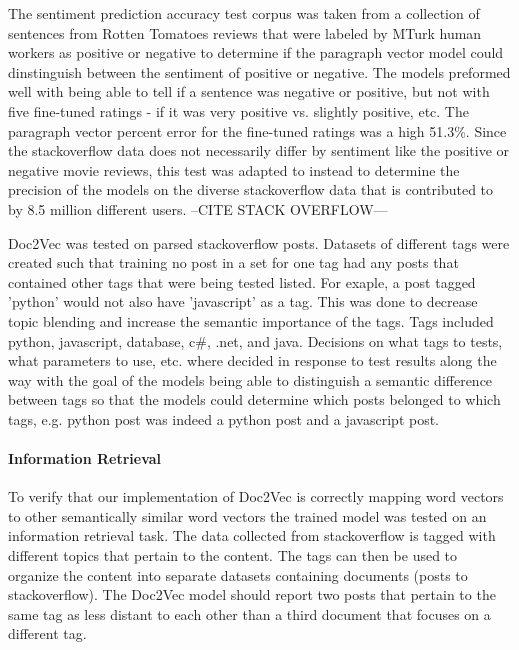 The sentiment prediction accuracy test corpus was taken from a collection of sentences from Rotten Tomatoes reviews that were labeled by MTurk human workers as positive or negative to determine if the paragraph vector model could dinstinguish between the sentiment of positive or negative. The models preformed well with being able to tell if a sentence was negative or positive, but not with five fine-tuned ratings - if it was very positive vs. slightly positive, etc. The paragraph vector percent error for the fine-tuned ratings was a high 51.3\%. Since the stackoverflow data does not necessarily differ by sentiment like the positive or negative movie reviews, this test was adapted to instead to determine the precision of the models on the diverse stackoverflow data that is contributed to by 8.5 million different users. --CITE STACK OVERFLOW---

Doc2Vec was tested on parsed stackoverflow posts. Datasets of different tags were created such that training no post in a set for one tag had any posts that contained other tags that were being tested listed. For exaple, a post tagged 'python' would not also have 'javascript' as a tag. This was done to decrease topic blending and increase the semantic importance of the tags. Tags included python, javascript, database, c\#, .net, and java. Decisions on what tags to tests, what parameters to use, etc. where decided in response to test results along the way with the goal of the models being able to distinguish a semantic difference between tags so that the models could determine which posts belonged to which tags, e.g. python post was indeed a python post and a javascript post.

\paragraph{Information Retrieval} To verify that our implementation of Doc2Vec is correctly mapping word vectors to other semantically similar word vectors the trained model was tested on an information retrieval task. The data collected from stackoverflow is tagged with different topics that pertain to the content. The tags can then be used to organize the content into separate datasets containing documents (posts to stackoverflow). The Doc2Vec model should report two posts that pertain to the same tag as less distant to each other than a third document that focuses on a different tag.

